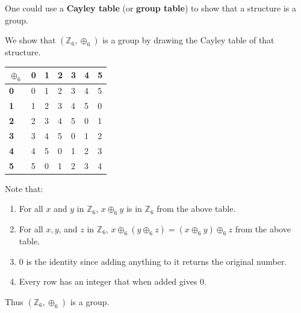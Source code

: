 One could use a \textbf{Cayley table} (or \textbf{group table}) to show that a structure is a group.
\begin{example}
    We show that $(\mathbb{Z}_6, \oplus_6)$ is a group by drawing the Cayley table of that structure.
    \begin{table}[h]
        \centering
        \begin{tabular}{|l|l|l|l|l|l|l|}
        \hline
        \textbf{$\oplus_6$} & \textbf{0} & \textbf{1} & \textbf{2} & \textbf{3} & \textbf{4} & \textbf{5} \\ \hline
        \textbf{0}          & 0          & 1          & 2          & 3          & 4          & 5          \\ \hline
        \textbf{1}          & 1          & 2          & 3          & 4          & 5          & 0          \\ \hline
        \textbf{2}          & 2          & 3          & 4          & 5          & 0          & 1          \\ \hline
        \textbf{3}          & 3          & 4          & 5          & 0          & 1          & 2          \\ \hline
        \textbf{4}          & 4          & 5          & 0          & 1          & 2          & 3          \\ \hline
        \textbf{5}          & 5          & 0          & 1          & 2          & 3          & 4          \\ \hline
        \end{tabular}
    \end{table}

    \newpage

    Note that:
    \begin{enumerate}
        \item For all $x$ and $y$ in $\mathbb{Z}_6$, $x \oplus_6 y$ is in $\mathbb{Z}_6$ from the above table.
        \item For all $x, y$, and $z$ in $\mathbb{Z}_6$, $x \oplus_6 (y \oplus_6 z) = (x \oplus_6 y) \oplus_6 z$ from the above table.
        \item 0 is the identity since adding anything to it returns the original number.
        \item Every row has an integer that when added gives 0.
    \end{enumerate}
    Thus $(\mathbb{Z}_6, \oplus_6)$ is a group.
\end{example}


